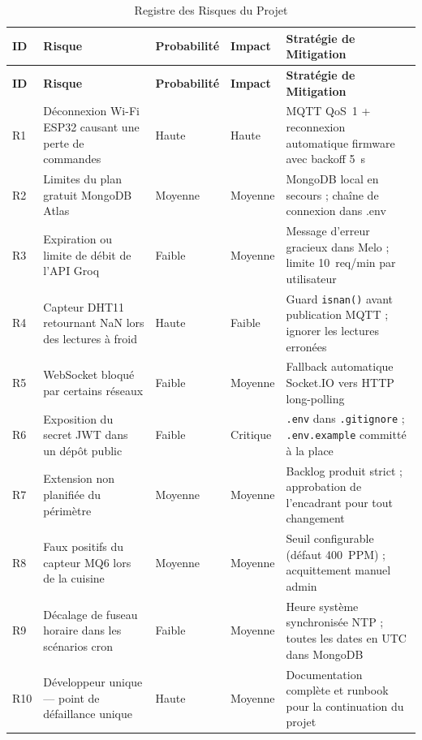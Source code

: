 \begin{center}
\begin{longtable}{p{} p{} p{} p{} p{}}
\caption{Registre des Risques du Projet}\label{tab:risks}\\
\toprule
\textbf{ID} & \textbf{Risque} & \textbf{Probabilité} & \textbf{Impact} & \textbf{Stratégie de Mitigation} \\
\midrule
\endfirsthead
\toprule
\textbf{ID} & \textbf{Risque} & \textbf{Probabilité} & \textbf{Impact} & \textbf{Stratégie de Mitigation} \\
\midrule
\endhead
\bottomrule
\endfoot
R1 & Déconnexion Wi-Fi ESP32 causant une perte de commandes & Haute & Haute & MQTT QoS~1 + reconnexion automatique firmware avec backoff 5~s \\
R2 & Limites du plan gratuit MongoDB Atlas & Moyenne & Moyenne & MongoDB local en secours ; chaîne de connexion dans .env \\
R3 & Expiration ou limite de débit de l'API Groq & Faible & Moyenne & Message d'erreur gracieux dans Melo ; limite 10~req/min par utilisateur \\
R4 & Capteur DHT11 retournant NaN lors des lectures à froid & Haute & Faible & Guard \texttt{isnan()} avant publication MQTT ; ignorer les lectures erronées \\
R5 & WebSocket bloqué par certains réseaux & Faible & Moyenne & Fallback automatique Socket.IO vers HTTP long-polling \\
R6 & Exposition du secret JWT dans un dépôt public & Faible & Critique & \texttt{.env} dans \texttt{.gitignore} ; \texttt{.env.example} committé à la place \\
R7 & Extension non planifiée du périmètre & Moyenne & Moyenne & Backlog produit strict ; approbation de l'encadrant pour tout changement \\
R8 & Faux positifs du capteur MQ6 lors de la cuisine & Moyenne & Moyenne & Seuil configurable (défaut 400~PPM) ; acquittement manuel admin \\
R9 & Décalage de fuseau horaire dans les scénarios cron & Faible & Moyenne & Heure système synchronisée NTP ; toutes les dates en UTC dans MongoDB \\
R10& Développeur unique --- point de défaillance unique & Haute & Moyenne & Documentation complète et runbook pour la continuation du projet \\
\end{longtable}
\end{center}

